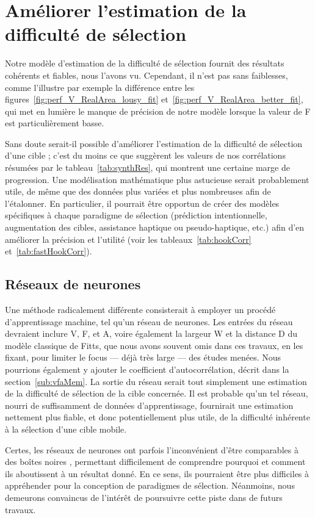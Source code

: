 	\section{Améliorer l'estimation de la difficulté de sélection}
	Notre modèle d'estimation de la difficulté de sélection fournit des résultats cohérents et fiables, nous l'avons vu. Cependant, il n'est pas sans faiblesses, comme l'illustre par exemple la différence entre les figures~\ref{fig:perf_V_RealArea_lousy_fit} et~\ref{fig:perf_V_RealArea_better_fit}, qui met en lumière le manque de précision de notre modèle lorsque la valeur de F est particulièrement basse.
	
	Sans doute serait-il possible d'améliorer l'estimation de la difficulté de sélection d'une cible ; c'est du moins ce que suggèrent les valeurs de nos corrélations résumées par le tableau~\ref{tab:synthRes}, qui montrent une certaine marge de progression. Une modélisation mathématique plus astucieuse serait probablement utile, de même que des données plus variées et plus nombreuses afin de l'étalonner. En particulier, il pourrait être opportun de créer des modèles spécifiques à chaque paradigme de sélection (prédiction intentionnelle, augmentation des cibles, assistance haptique ou pseudo-haptique, etc.) afin d'en améliorer la précision et l'utilité (voir les tableaux~\ref{tab:hookCorr} et~\ref{tab:fastHookCorr}).
	
	\subsection{Réseaux de neurones}
	Une méthode radicalement différente consisterait à employer un procédé d'apprentissage machine, tel qu'un réseau de neurones. Les entrées du réseau devraient inclure V, F, et A, voire également la largeur W et la distance D du modèle classique de Fitts, que nous avons souvent omis dans ces travaux, en les fixant, pour limiter le focus --- déjà très large --- des études menées. Nous pourrions également y ajouter le coefficient d'autocorrélation, décrit dans la section~\ref{sub:vfaMem}. La sortie du réseau serait tout simplement une estimation de la difficulté de sélection de la cible concernée. Il est probable qu'un tel réseau, nourri de suffisamment de données d'apprentissage, fournirait une estimation nettement plus fiable, et donc potentiellement plus utile, de la difficulté inhérente à la sélection d'une cible mobile.
	
	Certes, les réseaux de neurones ont parfois l'inconvénient d'être comparables à des \og boîtes noires \fg{}, permettant difficilement de comprendre pourquoi et comment ils aboutissent à un résultat donné. En ce sens, ils pourraient être plus difficiles à appréhender pour la conception de paradigmes de sélection. Néanmoins, nous demeurons convaincus de l'intérêt de poursuivre cette piste dans de futurs travaux.
	
